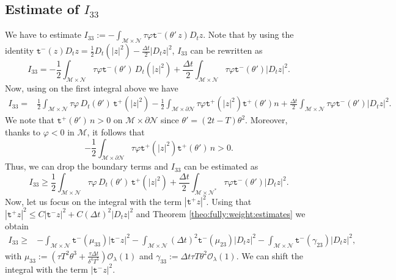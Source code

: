 \documentclass[11pt,oneside,leqno]{amsart}
\numberwithin{equation}{section}
\numberwithin{equation}{section}
\newcommand{\trp}{\mathtt t^+}
\newcommand{\trm}{\mathtt t^-}
\begin{document}
\subsection{Estimate of $I_{33}$}
We have to estimate
$\displaystyle I_{33}:=-\int_{\mathcal{M}\times\mathcal{N}}\tau\varphi\trm(\theta'\,z)D_{t}z$. Note that by using the identity $\trm(z)D_{t}z=\frac{1}{2}D_{t}(|z|^{2})-\frac{\Delta t}{2}|D_{t}z|^{2}$, $I_{33}$ can be rewritten as 
\begin{equation*}
I_{33}=-\frac{1}{2}\int_{\mathcal{M}\times\mathcal{N}}\tau\varphi\trm(\theta')\,D_{t}(|z|^{2})+\frac{\Delta t}{2}\int_{\mathcal{M}\times\mathcal{N}}\tau\varphi\trm(\theta')|D_{t}z|^{2}.
\end{equation*}
Now, using \cite[Equation (2.9)]{LMPZ:2023} on the first integral above we have 
\begin{equation*}
\begin{split}
    I_{33}=&\frac{1}{2}\int_{\mathcal{M}\times\mathcal{N}}\tau\varphi\,D_{t}(\theta')\,\trp(|z|^{2})-\frac{1}{2}\int_{\mathcal{M}\times\partial \mathcal{N}}\tau\varphi\trp(|z|^{2})\trp(\theta')n+\frac{\Delta t}{2}\int_{\mathcal{M}\times\mathcal{N}}\tau\varphi\trm(\theta')|D_{t}z|^{2}.
    \end{split}
\end{equation*}
We note that $\trp(\theta')\,n>0$ on $\mathcal{M}\times\partial\mathcal{N}$ since $\theta'=(2t-T)\theta^{2}$. Moreover, thanks to $\varphi<0$ in $\mathcal{M}$, it follows that
\begin{equation}
-\frac{1}{2}\int_{\mathcal{M}\times\partial\mathcal{N}}\tau\varphi\trp(|z|^{2})\trp(\theta')\,n>0.
\end{equation}
Thus, we can drop the boundary terms and $I_{33}$ can be estimated as
\begin{equation*}
    I_{33}\geq\frac{1}{2}\int_{\mathcal{M}\times\mathcal{N}}\tau\varphi\,D_{t}(\theta')\,\trp(|z|^{2})+\frac{\Delta t}{2}\int_{\mathcal{M}\times\mathcal{N}^{\ast}}\tau\varphi\trm(\theta')|D_{t}z|^{2}.
\end{equation*}    
Now, let us focus on the integral with the term $|\trp z|^{2}$. Using that $|\trp z|^{2}\leq C|\trm z|^{2}+C(\Delta t)^{2}|D_{t}z|^{2}$ and Theorem \ref{theo:fully:weight:estimates} we obtain
\begin{equation*}
    \begin{split}
        I_{33}\geq &-\int_{\mathcal{M}\times\mathcal{N}}\trm(\mu_{33})|\trm z|^{2}-\int_{\mathcal{M}\times\mathcal{N}}(\Delta t)^{2}\trm(\mu_{23})|D_{t}z|^{2}-\int_{\mathcal{M}\times\mathcal{N}}\trm(\gamma_{23})|D_{t}z|^{2},
    \end{split}
\end{equation*}
with $\mu_{33}:=(\tau T^{2}\theta^{3}+\frac{\tau \Delta t}{\delta^{4}T^{5}})\mathcal{O}_{\lambda}(1)$ and $\gamma_{33}:=\Delta t \tau T\theta^{2}\mathcal{O}_{\lambda}(1)$. We can shift the integral with the term $|\trm z|^{2}$.



\end{document}
